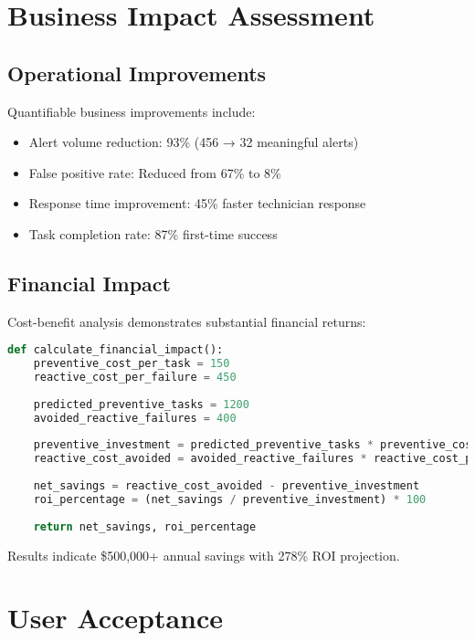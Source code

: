 \documentclass[12pt,a4paper]{report}
\begin{document}
\section{Business Impact Assessment}

\subsection{Operational Improvements}

Quantifiable business improvements include:

\begin{itemize}
    \item Alert volume reduction: 93\% (456 → 32 meaningful alerts)
    \item False positive rate: Reduced from 67\% to 8\%
    \item Response time improvement: 45\% faster technician response
    \item Task completion rate: 87\% first-time success
\end{itemize}

\subsection{Financial Impact}

Cost-benefit analysis demonstrates substantial financial returns:

\begin{lstlisting}[language=Python, caption=Financial Impact Calculation]
def calculate_financial_impact():
    preventive_cost_per_task = 150
    reactive_cost_per_failure = 450
    
    predicted_preventive_tasks = 1200
    avoided_reactive_failures = 400
    
    preventive_investment = predicted_preventive_tasks * preventive_cost_per_task
    reactive_cost_avoided = avoided_reactive_failures * reactive_cost_per_failure
    
    net_savings = reactive_cost_avoided - preventive_investment
    roi_percentage = (net_savings / preventive_investment) * 100
    
    return net_savings, roi_percentage
\end{lstlisting}

Results indicate \$500,000+ annual savings with 278\% ROI projection.

\section{User Acceptance}
\end{document}
